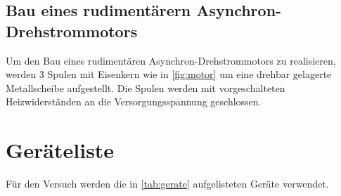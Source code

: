 \documentclass[12pt,english,ngerman]{scrartcl}
\begin{document}
\subsection{Bau eines rudimentärern Asynchron-Drehstrommotors}

Um den Bau eines rudimentären Asynchron-Drehstrommotors zu realisieren, werden 3 Spulen mit Eisenkern wie in 
\autoref{fig:motor} um eine drehbar gelagerte Metallscheibe aufgestellt. Die Spulen werden mit vorgeschalteten 
Heizwiderständen an die Versorgungsspannung geschlossen.




\section{Geräteliste}
\label{sec:geraeteliste}

Für den Versuch werden die in \autoref{tab:gerate} aufgelisteten Geräte verwendet.

\end{document}
